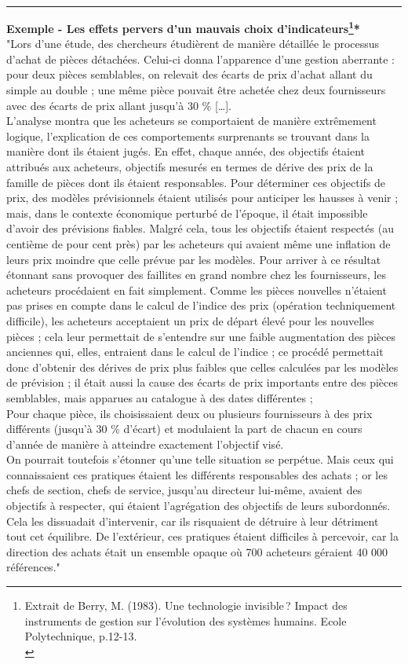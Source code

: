 \documentclass{tufte-handout}
\begin{document}
\begin{enumerate}
\noindent\rule{\textwidth}{0.5pt}
\textbf{Exemple - Les effets pervers d'un mauvais choix d'indicateurs\footnote{Extrait de Berry, M. (1983). Une technologie invisible ? Impact des instruments de gestion sur l’évolution des systèmes humains. Ecole Polytechnique, p.12-13.\\}*}\\
"Lors d’une étude, des chercheurs étudièrent de manière détaillée le processus d’achat de pièces détachées. Celui-ci donna l'apparence d'une gestion aberrante : pour deux pièces semblables, on relevait des écarts de prix d'achat allant du simple au double ; une même pièce pouvait être achetée chez deux fournisseurs avec des écarts de prix allant jusqu'à 30 \% […].\\
L'analyse montra que les acheteurs se comportaient de manière extrêmement logique, l'explication de ces comportements surprenants se trouvant dans la manière dont ils étaient jugés. En effet, chaque année, des objectifs étaient attribués aux acheteurs, objectifs mesurés en termes de dérive des prix de la famille de pièces dont ils étaient responsables. Pour déterminer ces objectifs de prix, des modèles prévisionnels étaient utilisés pour anticiper les hausses à venir ; mais, dans le contexte économique perturbé de l'époque, il était impossible d'avoir des prévisions fiables. Malgré cela, tous les objectifs étaient respectés (au centième de pour cent près) par les acheteurs qui avaient même une inflation de leurs prix moindre que celle prévue par les modèles. Pour arriver à ce résultat étonnant sans provoquer des faillites en grand nombre chez les fournisseurs, les acheteurs procédaient en fait simplement. Comme les pièces nouvelles n'étaient pas prises en compte dans le calcul de l'indice des prix (opération techniquement difficile), les acheteurs acceptaient un prix de départ élevé pour les nouvelles pièces ; cela leur permettait de s'entendre sur une faible augmentation des pièces anciennes qui, elles, entraient dans le calcul de l'indice ; ce procédé permettait donc d'obtenir des dérives de prix plus faibles que celles calculées par les modèles de prévision ; il était aussi la cause des écarts de prix importants entre des pièces semblables, mais apparues au catalogue à des dates différentes ;\\
Pour chaque pièce, ils choisissaient deux ou plusieurs fournisseurs à des prix différents (jusqu'à 30 \% d'écart) et modulaient la part de chacun en cours d'année de manière à atteindre exactement l'objectif visé.\\
On pourrait toutefois s'étonner qu'une telle situation se perpétue. Mais ceux qui connaissaient ces pratiques étaient les différents responsables des achats ; or les chefs de section, chefs de service, jusqu'au directeur lui-même, avaient des objectifs à respecter, qui étaient l'agrégation des objectifs de leurs subordonnés. Cela les dissuadait d'intervenir, car ils risquaient de détruire à leur détriment tout cet équilibre. De l'extérieur, ces pratiques étaient difficiles à percevoir, car la direction des achats était un ensemble opaque où 700 acheteurs géraient 40 000 références."\\


\end{enumerate}
\end{document}
